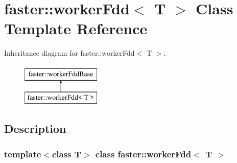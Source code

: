 \hypertarget{classfaster_1_1workerFdd}{}\section{faster\+:\+:worker\+Fdd$<$ T $>$ Class Template Reference}
\label{classfaster_1_1workerFdd}
Inheritance diagram for faster\+:\+:worker\+Fdd$<$ T $>$\+:\begin{figure}[H]
\begin{center}
\leavevmode
\includegraphics[height=2.000000cm]{classfaster_1_1workerFdd}
\end{center}
\end{figure}


\subsection{Description}
\subsubsection*{template$<$class T$>$\newline
class faster\+::worker\+Fdd$<$ T $>$}

